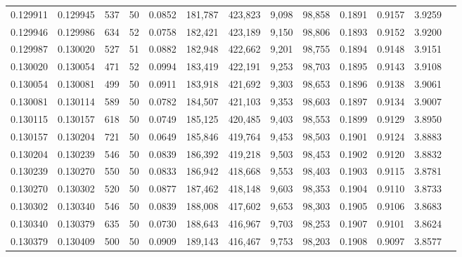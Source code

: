 \begin{tabular}{rrrrrrrrrrrrr}
0.129911 & 0.129945 &   537 &  50 &                                     0.0852 & 181,787 & 423,823 &   9,098 &  98,858 & 0.1891 & 0.9157 & 3.9259 \\
0.129946 & 0.129986 &   634 &  52 &                                     0.0758 & 182,421 & 423,189 &   9,150 &  98,806 & 0.1893 & 0.9152 & 3.9200 \\
0.129987 & 0.130020 &   527 &  51 &                                     0.0882 & 182,948 & 422,662 &   9,201 &  98,755 & 0.1894 & 0.9148 & 3.9151 \\
0.130020 & 0.130054 &   471 &  52 &                                     0.0994 & 183,419 & 422,191 &   9,253 &  98,703 & 0.1895 & 0.9143 & 3.9108 \\
0.130054 & 0.130081 &   499 &  50 &                                     0.0911 & 183,918 & 421,692 &   9,303 &  98,653 & 0.1896 & 0.9138 & 3.9061 \\
0.130081 & 0.130114 &   589 &  50 &                                     0.0782 & 184,507 & 421,103 &   9,353 &  98,603 & 0.1897 & 0.9134 & 3.9007 \\
0.130115 & 0.130157 &   618 &  50 &                                     0.0749 & 185,125 & 420,485 &   9,403 &  98,553 & 0.1899 & 0.9129 & 3.8950 \\
0.130157 & 0.130204 &   721 &  50 &                                     0.0649 & 185,846 & 419,764 &   9,453 &  98,503 & 0.1901 & 0.9124 & 3.8883 \\
0.130204 & 0.130239 &   546 &  50 &                                     0.0839 & 186,392 & 419,218 &   9,503 &  98,453 & 0.1902 & 0.9120 & 3.8832 \\
0.130239 & 0.130270 &   550 &  50 &                                     0.0833 & 186,942 & 418,668 &   9,553 &  98,403 & 0.1903 & 0.9115 & 3.8781 \\
0.130270 & 0.130302 &   520 &  50 &                                     0.0877 & 187,462 & 418,148 &   9,603 &  98,353 & 0.1904 & 0.9110 & 3.8733 \\
0.130302 & 0.130340 &   546 &  50 &                                     0.0839 & 188,008 & 417,602 &   9,653 &  98,303 & 0.1905 & 0.9106 & 3.8683 \\
0.130340 & 0.130379 &   635 &  50 &                                     0.0730 & 188,643 & 416,967 &   9,703 &  98,253 & 0.1907 & 0.9101 & 3.8624 \\
0.130379 & 0.130409 &   500 &  50 &                                     0.0909 & 189,143 & 416,467 &   9,753 &  98,203 & 0.1908 & 0.9097 & 3.8577 \\

\end{tabular}

